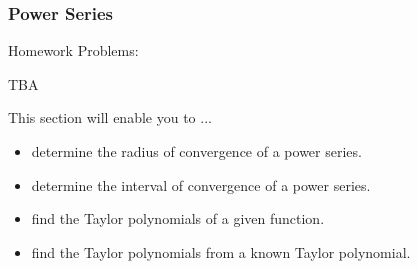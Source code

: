 %
%

\begin{frame}
\frametitle{\Large {\color[rgb]{0.02,0.20,1.0} Power Series}}
\scriptsize
\vspace{0.6cm}
\begin{block}{Homework Problems:}

\vspace{0.8cm}

TBA
	
\end{block}
\vspace{0.2cm}

%
%
%	
\vspace{0.1cm}

\begin{block}{This section will enable you to ...}
\begin{itemize}
	\item[...] determine the radius of convergence of a power series.
	\item[...] determine the interval of convergence of a power series.
	\item[...] find the Taylor polynomials of a given function.
	\item[...] find the Taylor polynomials from a known Taylor polynomial.
\end{itemize}
\end{block}
\vspace{3.0cm}
\end{frame}

